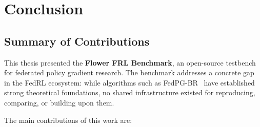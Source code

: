 
\chapter{Conclusion}\label{ch:conclusion}

\section*{Summary of Contributions}

This thesis presented the \textbf{Flower FRL Benchmark}, an open-source testbench
for federated policy gradient research. The benchmark addresses a concrete gap in
the FedRL ecosystem: while algorithms such as FedPG-BR~\cite{flint2023fedpgbr}
have established strong theoretical foundations, no shared infrastructure existed
for reproducing, comparing, or building upon them.

The main contributions of this work are:

